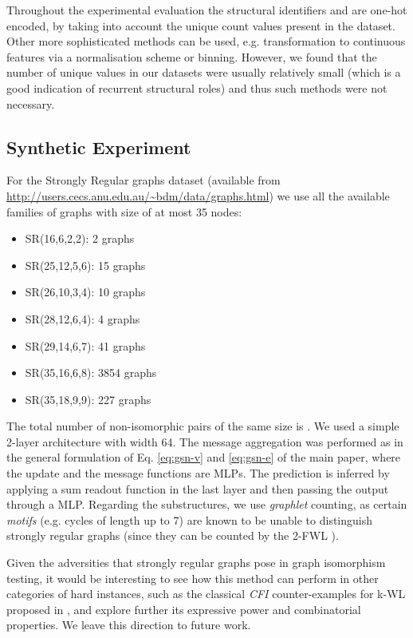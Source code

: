 \documentclass{article} \usepackage{iclr2021_conference,times}
\begin{document}
Throughout the experimental evaluation the structural identifiers  and  are one-hot encoded, by taking into account the unique count values present in the dataset. Other more sophisticated methods can be used, e.g. transformation to continuous features via a normalisation scheme or binning. However, we found that the number of unique values in our datasets were usually relatively small (which is a good indication of recurrent structural roles) and thus such methods were not necessary.



\subsection{Synthetic Experiment}

For the Strongly Regular graphs dataset (available from \url{http://users.cecs.anu.edu.au/~bdm/data/graphs.html}) we use all the available families of graphs with size of at most 35 nodes: 

\begin{itemize}
    \item SR(16,6,2,2): 2 graphs
    \item SR(25,12,5,6): 15 graphs
    \item SR(26,10,3,4): 10 graphs
    \item SR(28,12,6,4): 4 graphs
    \item SR(29,14,6,7): 41 graphs
    \item SR(35,16,6,8): 3854 graphs
    \item SR(35,18,9,9): 227 graphs
\end{itemize}

The total number of non-isomorphic pairs of the same size is . We used a simple 2-layer architecture with width 64. The message aggregation was performed as in the general formulation of Eq. \ref{eq:gsn-v} and \ref{eq:gsn-e} of the main paper, where the update and the message functions are MLPs. The prediction is inferred by applying a sum readout function in the last layer and then passing the output through a MLP. Regarding the substructures, we use \textit{graphlet} counting, as certain \textit{motifs} (e.g. cycles of length up to 7) are known to be unable to distinguish strongly regular graphs (since they can be counted by the 2-FWL \citep{furer2017combinatorial, DBLP:conf/fct/ArvindFKV19}).

Given the adversities that strongly regular graphs pose in graph isomorphism testing, it would be interesting to see how this method can perform in other categories of hard instances, such as the classical  \textit{CFI} counter-examples for k-WL proposed in \cite{DBLP:journals/combinatorica/CaiFI92}, and explore further its expressive power and combinatorial properties. We leave this direction to future work.
\end{document}
